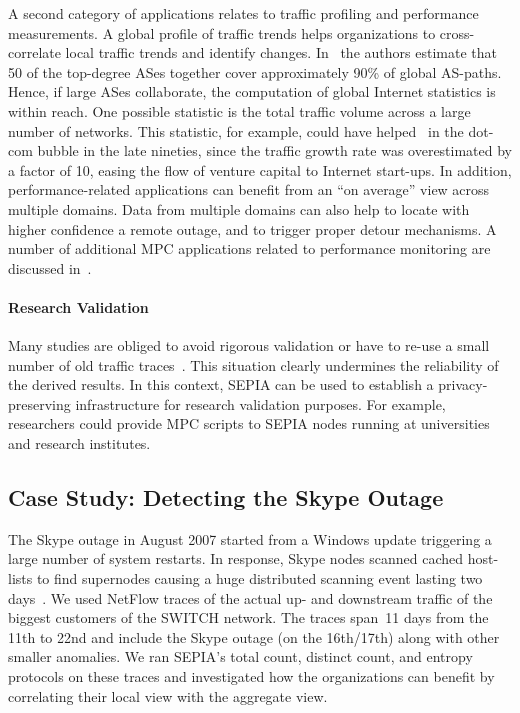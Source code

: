 \documentclass[letterpaper,11pt,onecolumn,titlepage]{article}
\begin{document}
A second category of applications relates to traffic profiling and
performance measurements. A global profile of traffic trends helps
organizations to cross-correlate local traffic trends and identify
changes. In~\cite{sekar2004tfi} the authors estimate that 50 of the
top-degree ASes together cover approximately 90\% of global AS-paths.
Hence, if large ASes collaborate, the computation of global Internet
statistics is within reach. One possible statistic is the total
traffic volume across a large number of networks. This statistic, for
example, could have helped~\cite{roughan2006sdd} in the dot-com bubble
in the late nineties, since the traffic growth rate was overestimated
by a factor of 10, easing the flow of venture capital to Internet
start-ups. In addition, performance-related applications can benefit
from an ``on average'' view across multiple domains. Data from
multiple domains can also help to locate with higher confidence a
remote outage, and to trigger proper detour mechanisms. A number of
additional MPC applications related to performance monitoring are
discussed in~\cite{roughan2006ppp}.

\paragraph{Research Validation}

Many studies are obliged to avoid rigorous validation or have to
re-use a small number of old traffic
traces~\cite{claffy2006con,slagell2005scn}.  This situation clearly
undermines the reliability of the derived results. In this context,
SEPIA can be used to establish a privacy-preserving infrastructure for
research validation purposes. For example, researchers could provide
MPC scripts to SEPIA nodes running at universities and research
institutes.


\subsection{Case Study: Detecting the Skype Outage}
\label{sec:casestudy}



The Skype outage in August 2007 started from a
Windows update triggering a large number of system restarts. In
response, Skype nodes scanned cached host-lists to find
supernodes causing a huge distributed scanning event lasting two
days~\cite{rossi2009understanding}. We used NetFlow traces of the actual up- and downstream traffic 
of the  biggest customers of the SWITCH network. The traces span~11 days from the 11th to 22nd and include
the Skype outage (on the 16th/17th) along with other smaller
anomalies. We ran SEPIA's total count, distinct count, and entropy 
protocols on these traces and investigated how the organizations can
benefit by correlating their local view with the aggregate view.
\end{document}
